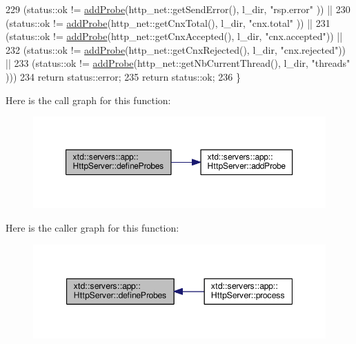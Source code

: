 \begin{DoxyCode}
229       (status::ok != \hyperlink{classxtd_1_1servers_1_1app_1_1HttpServer_a0ff20a40a0e31dbb1e82be87be0e255f}{addProbe}(http\_net::getSendError(),        l\_dir,        \textcolor{stringliteral}{"rsp.error"}   )) ||
230       (status::ok != \hyperlink{classxtd_1_1servers_1_1app_1_1HttpServer_a0ff20a40a0e31dbb1e82be87be0e255f}{addProbe}(http\_net::getCnxTotal(),         l\_dir,        \textcolor{stringliteral}{"cnx.total"}   )) ||
231       (status::ok != \hyperlink{classxtd_1_1servers_1_1app_1_1HttpServer_a0ff20a40a0e31dbb1e82be87be0e255f}{addProbe}(http\_net::getCnxAccepted(),      l\_dir,        \textcolor{stringliteral}{"cnx.accepted"})) ||
232       (status::ok != \hyperlink{classxtd_1_1servers_1_1app_1_1HttpServer_a0ff20a40a0e31dbb1e82be87be0e255f}{addProbe}(http\_net::getCnxRejected(),      l\_dir,        \textcolor{stringliteral}{"cnx.rejected"})) ||
233       (status::ok != \hyperlink{classxtd_1_1servers_1_1app_1_1HttpServer_a0ff20a40a0e31dbb1e82be87be0e255f}{addProbe}(http\_net::getNbCurrentThread(),  l\_dir,        \textcolor{stringliteral}{"threads"}     )))
234     \textcolor{keywordflow}{return} status::error;
235   \textcolor{keywordflow}{return} status::ok;
236 \}
\end{DoxyCode}


Here is the call graph for this function\+:
\nopagebreak
\begin{figure}[H]
\begin{center}
\leavevmode
\includegraphics[width=350pt]{classxtd_1_1servers_1_1app_1_1HttpServer_a66c2a3b5bca8390d96b35daebfccabf3_cgraph}
\end{center}
\end{figure}




Here is the caller graph for this function\+:
\nopagebreak
\begin{figure}[H]
\begin{center}
\leavevmode
\includegraphics[width=347pt]{classxtd_1_1servers_1_1app_1_1HttpServer_a66c2a3b5bca8390d96b35daebfccabf3_icgraph}
\end{center}
\end{figure}


